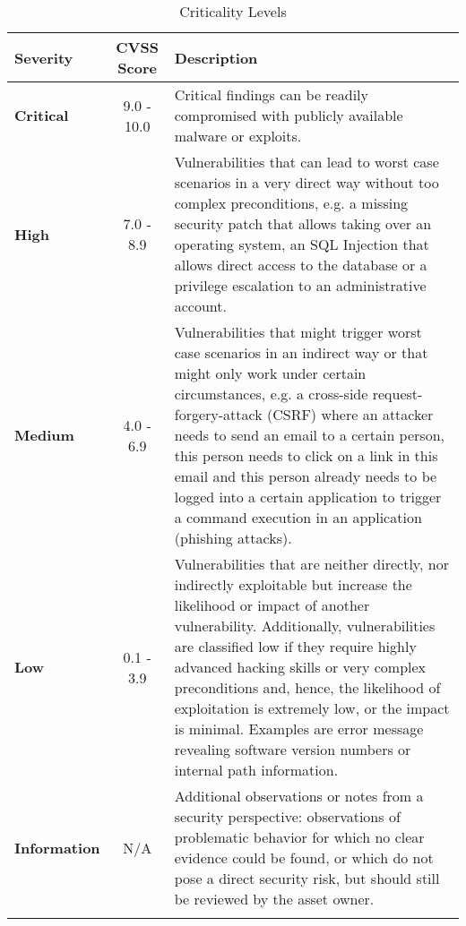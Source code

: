 \begin{xltabular}{\textwidth}{|l|c|X|}
	\hline
	 \textbf{Severity} &  \textbf{CVSS Score} &  \textbf{Description} \\
	\hline
	 \color{black} \textbf{Critical} & 9.0 - 10.0 & Critical findings can be readily compromised with publicly available malware or exploits. \\
	\hline
	 \color{black} \textbf{High} & 7.0 - 8.9 & Vulnerabilities that can lead to worst case scenarios in a very direct way without too complex preconditions, e.g. a missing security patch that allows taking over an operating system, an SQL Injection that allows direct access to the database or a privilege escalation to an administrative account. \\
	\hline
	 \color{black} \textbf{Medium} & 4.0 - 6.9 & Vulnerabilities that might trigger worst case scenarios in an indirect way or that might only work under certain circumstances, e.g. a cross-side request- forgery-attack (CSRF) where an attacker needs to send an email to a certain person, this person needs to click on a link in this email and this person already needs to be logged into a certain application to trigger a command execution in an application (phishing attacks). \\
	\hline
	\color{black} \textbf{Low} & 0.1 - 3.9 & Vulnerabilities that are neither directly, nor indirectly exploitable but increase the likelihood or impact of another vulnerability. Additionally, vulnerabilities are classified low if they require highly advanced hacking skills or very complex preconditions and, hence, the likelihood of exploitation is extremely low, or the impact is minimal. Examples are error message revealing software version numbers or internal path information. \\
	\hline
	\color{black} \textbf{Information} & N/A & Additional observations or notes from a security perspective: observations of problematic behavior for which no clear evidence could be found, or which do not pose a direct security risk, but should still be reviewed by the asset owner. \\
	\hline
	\caption{Criticality Levels} \label{table:CriticalityLevels}
\end{xltabular}


